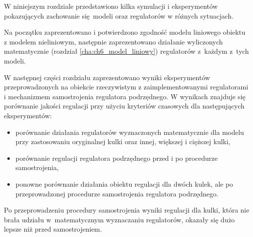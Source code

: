 W niniejszym rozdziale przedstawiono kilka symulacji i eksperymentów pokazujących zachowanie się modeli oraz regulatorów w różnych sytuacjach.

Na początku zaprezentowano i potwierdzono zgodność modelu liniowego obiektu z modelem nieliniowym, następnie zaprezentowano działanie wyliczonych matematycznie (rozdział \ref{cha:ch6_model_liniowy}) regulatorów z~każdym z~tych modeli.

W następnej części rozdziału zaprezentowano wyniki eksperymentów przeprowadzonych na obiekcie rzeczywistym z zaimplementowanymi regulatorami i mechanizmem samostrojenia regulatora podrzędnego. W wynikach znajduje się porównanie jakości regulacji przy użyciu kryteriów czasowych dla następujących eksperymentów:
\begin{itemize}
    \item porównanie działania regulatorów wyznaczonych matematycznie dla modelu przy zastosowaniu oryginalnej kulki oraz innej, większej i cięższej kulki,
    \item porównanie regulacji regulatora podrzędnego przed i po procedurze samostrojenia,
    \item ponowne porównanie działania obiektu regulacji dla dwóch kulek, ale po przeprowadzonej procedurze samostrojenia regulatora podrzędnego.
\end{itemize}

Po przeprowadzeniu procedury samostrojenia wyniki regulacji dla kulki, która nie brała udziału w~matematycznym wyznaczaniu regulatorów, okazały się dużo lepsze niż przed samostrojeniem.



